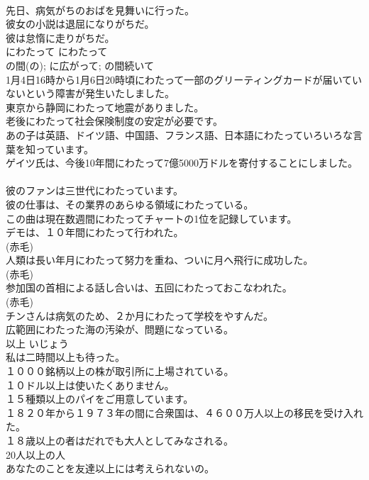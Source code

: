 \documentclass[8pt]{extreport}
\begin{document}
\begin{CJK}{UTF8}{min}
\\	先日、病気がちのおばを見舞いに行った。  
\\	彼女の小説は退屈になりがちだ。  
\\	彼は怠惰に走りがちだ。  
\\	にわたって	にわたって	
\\	の間(の); に広がって; の間続いて	
\\	1月4日16時から1月6日20時頃にわたって一部のグリーティングカードが届いていないという障害が発生いたしました。  
\\	東京から静岡にわたって地震がありました。  
\\	老後にわたって社会保険制度の安定が必要です。  
\\	あの子は英語、ドイツ語、中国語、フランス語、日本語にわたっていろいろな言葉を知っています。  
\\	ゲイツ氏は、今後10年間にわたって7億5000万ドルを寄付することにしました。   
\\	彼のファンは三世代にわたっています。   
\\	彼の仕事は、その業界のあらゆる領域にわたっている。   
\\	この曲は現在数週間にわたってチャートの1位を記録しています。  
\\	デモは、１０年間にわたって行われた。  
\\	(赤毛)
\\	人類は長い年月にわたって努力を重ね、ついに月へ飛行に成功した。  
\\	(赤毛)
\\	参加国の首相による話し合いは、五回にわたっておこなわれた。  
\\	(赤毛)
\\	チンさんは病気のため、２か月にわたって学校をやすんだ。  
\\	広範囲にわたった海の汚染が、問題になっている。  
\\	以上	いじょう	
\\	私は二時間以上も待った。  
\\	１０００銘柄以上の株が取引所に上場されている。  
\\	１０ドル以上は使いたくありません。  
\\	１５種類以上のパイをご用意しています。  
\\	１８２０年から１９７３年の間に合衆国は、４６００万人以上の移民を受け入れた。  
\\	１８歳以上の者はだれでも大人としてみなされる。  
\\	20人以上の人  
\\	あなたのことを友達以上には考えられないの。  

\end{CJK}
\end{document}
